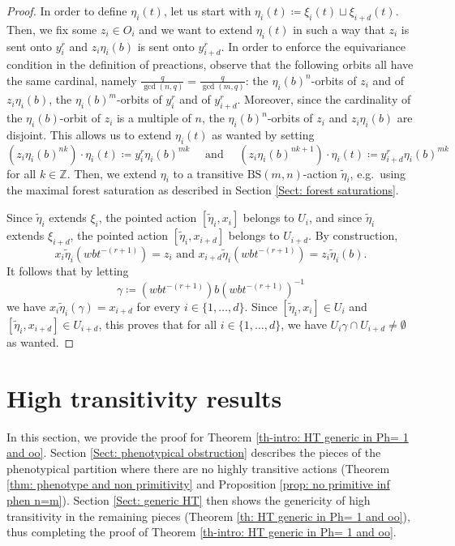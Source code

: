 \documentclass[12pt]{article}
\numberwithin{equation}{section}
\theoremstyle{definition}
\newcommand{\Z}{\mathbb{Z}}
\newcommand{\inv}{^{-1}}
\newcommand\BSo{\mathrm{BS}}
\begin{document}
\begin{proof}
	In order to define $\eta_i(t)$, let us start with $\eta_i(t) \coloneqq \xi_{i}(t) \sqcup \xi_{i+d}(t)$.
	Then, we fix some $z_i\in O_i$ and we want to extend $\eta_i(t)$ in such a way that $z_i$ is sent onto $y^r_i$ and $z_i\eta_i(b)$ is sent onto $y^r_{i+d}$.
	In order to enforce
	the equivariance condition in the definition of preactions, observe
	that the following orbits all have the same cardinal, namely $\frac{q}{\gcd(n,q)}=\frac{q}{\gcd(m,q)}$:  the $\eta_i(b)^n$-orbits of $z_i$ and of $z_i \eta_i(b)$, the $\eta_i(b)^m$-orbits of $y^r_i$ and of $y^r_{i+d}$. 
	Moreover, since the cardinality of the $\eta_i(b)$-orbit of $z_i$ is a multiple of $n$, the $\eta_i(b)^n$-orbits of $z_i$ and $z_i \eta_i(b)$ are disjoint.
	This allows us to extend $\eta_i(t)$ as wanted
	by setting
	\[
	\left( z_i \eta_i(b)^{nk} \right) \cdot \eta_i(t) \coloneqq y^r_i\eta_i(b)^{mk}
	\quad \text{ and } \quad
	\left( z_{i} \eta_i(b)^{nk+1} \right)\cdot  \eta_i(t) \coloneqq y^r_{i+d}  \eta_{i}(b)^{mk}
	\] 
	for all $k\in\Z$.
	Then, we extend $\eta_i$ to a transitive \( \BSo(m,n)  \)-action $\tilde \eta_i$, e.g.\ using the maximal forest saturation as described in Section \ref{Sect: forest saturations}.
	
	Since $\tilde \eta_i$ extends $\xi_i$, the pointed action $[\tilde \eta_i,x_i]$ belongs to $U_i$,  and since $\tilde \eta_i$ extends $\xi_{i+d}$, the pointed action $[\tilde \eta_i,x_{i+d}]$ belongs to $U_{i+d}$.
	By construction, 
	\[
	x_i\tilde\eta_i(wbt^{-(r+1)})=z_i\text{ and }x_{i+d}\tilde\eta_i(wbt^{-(r+1)})=z_i\tilde\eta_i(b).
	\]
	It follows that by letting 
	\[
	\gamma \coloneqq \left(wbt^{-(r+1)}\right) b \left(wbt^{-(r+1)}\right)\inv
	\] 
	we have $x_i\tilde \eta_i(\gamma)=x_{i+d}$ for every $i\in\{1,\dots,d\}$.
	Since $[\tilde \eta_i,x_i]\in U_i$ and $[\tilde \eta_i,x_{i+d}]\in U_{i+d}$, this proves that for all $i\in\{1,\dots,d\}$, we have $U_i\gamma\cap U_{i+d}\neq\emptyset$ as wanted.
\end{proof}

\section{High transitivity results} \label{Sec: HT}


In this section, we provide the proof for Theorem \ref{th-intro: HT generic in Ph= 1 and oo}. 
Section \ref{Sect: phenotypical obstruction} describes the pieces of the phenotypical partition where there are no highly transitive actions (Theorem \ref{thm: phenotype and non primitivity} and Proposition \ref{prop: no primitive inf phen n=m}).
Section \ref{Sect: generic HT} then shows the genericity
of high transitivity in the remaining pieces (Theorem \ref{th: HT generic in Ph= 1 and oo}), thus completing the proof of Theorem \ref{th-intro: HT generic in Ph= 1 and oo}.
\end{document}
